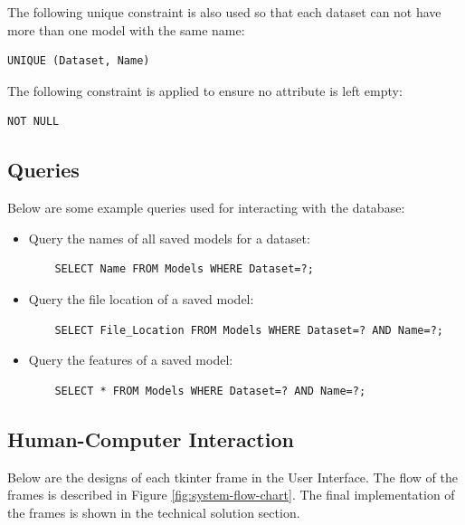 \documentclass[./project-report/src/latex/project-report.tex]{subfiles}
\begin{document}
The following unique constraint is also used so that each dataset can not have more than one model with the same name:

\begin{verbatim}
UNIQUE (Dataset, Name)
\end{verbatim}

The following constraint is applied to ensure no attribute is left empty:

\begin{verbatim}
NOT NULL
\end{verbatim}

\subsection{Queries}

Below are some example queries used for interacting with the database:

\begin{itemize}
    \item Query the names of all saved models for a dataset:
    \begin{verbatim}
    SELECT Name FROM Models WHERE Dataset=?;
    \end{verbatim}
    \item Query the file location of a saved model:
    \begin{verbatim}
    SELECT File_Location FROM Models WHERE Dataset=? AND Name=?;
    \end{verbatim}
    \item Query the features of a saved model:
    \begin{verbatim}
    SELECT * FROM Models WHERE Dataset=? AND Name=?;
    \end{verbatim}
\end{itemize}

\subsection{Human-Computer Interaction}

Below are the designs of each tkinter frame in the User Interface. The flow of the frames is described in Figure \ref{fig:system-flow-chart}. The final implementation of the 
frames is shown in the technical solution section.
\end{document}
